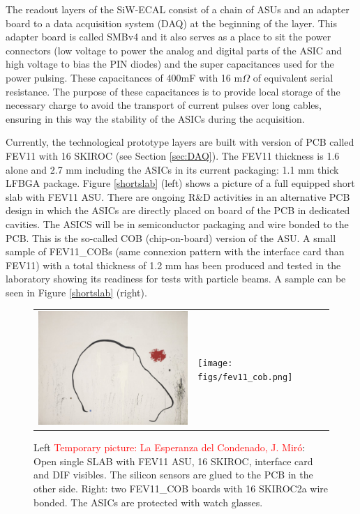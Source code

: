 \documentclass[a4paper,11pt]{article}
\newcommand{\todo}[1]{\textcolor{red}{{#1}}}
\begin{document}
The readout layers of the SiW-ECAL consist of a chain of ASUs and an adapter board
to a data acquisition system (DAQ) at the beginning of the layer.
This adapter board is called SMBv4
and it also serves as a place to sit the power connectors (low voltage to power the analog and digital
parts of the ASIC and high voltage to bias the PIN diodes) and the super capacitances used for the power pulsing. 
These capacitances of 400mF with 16 m$\Omega$ of equivalent serial resistance. 
The purpose of these capacitances is to provide local storage 
of the necessary charge to avoid the transport of current pulses over long cables, 
ensuring in this way the stability of the ASICs during the acquisition. 

Currently, the technological prototype layers are built with version of PCB called FEV11 with 16 SKIROC (see Section \ref{sec:DAQ}).
The FEV11 thickness is 1.6 alone and 2.7 mm including the ASICs in its current packaging: 1.1 mm thick LFBGA package.
Figure \ref{shortslab} (left) shows a picture of a full equipped short slab with FEV11 ASU.
There are ongoing R\&D activities in an alternative PCB design in which the ASICs
are directly placed on board of the PCB in dedicated cavities.
The ASICS will be in semiconductor packaging and wire bonded to the PCB. This is the so-called COB (chip-on-board) version of the ASU.
A small sample of FEV11\_COBs (same connexion pattern with the interface card than FEV11)
with a total thickness of 1.2 mm has been produced and tested in the laboratory
showing its readiness for tests with particle beams. A sample can be seen in Figure \ref{shortslab} (right).

\begin{figure}[!t]
  \centering
  \begin{tabular}{ll}
    \includegraphics[width=2.8in]{figs/test.jpg} & \texttt{[image: figs/fev11\_cob.png]} 
  \end{tabular}
  \caption{Left \todo{Temporary picture: La Esperanza del Condenado, J. Miró}: Open single SLAB with FEV11 ASU, 16 SKIROC, interface card and DIF visibles. The silicon sensors are glued to the PCB in the other side.
  Right: two FEV11\_COB boards with 16 SKIROC2a wire bonded. The ASICs are protected with watch glasses.}
\label{ASU}
\end{figure}
\end{document}
